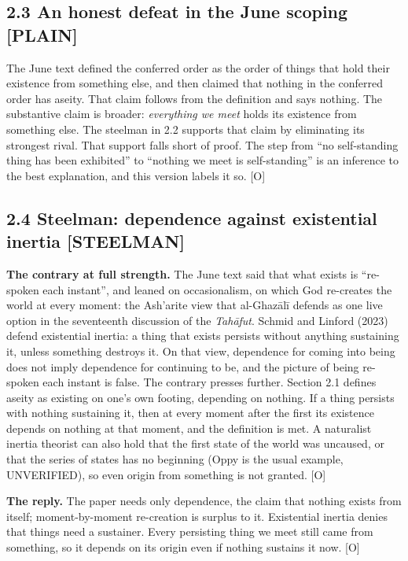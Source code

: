 \documentclass[11pt]{article}
\newcommand{\register}[1]{{\ttfamily\small #1}}
\begin{document}
\subsection*{2.3 An honest defeat in the June scoping \register{[PLAIN]}}

The June text defined the conferred order as the order of things that hold their existence from something else, and then claimed that nothing in the conferred order has aseity. That claim follows from the definition and says nothing. The substantive claim is broader: \emph{everything we meet} holds its existence from something else. The steelman in 2.2 supports that claim by eliminating its strongest rival. That support falls short of proof. The step from ``no self-standing thing has been exhibited'' to ``nothing we meet is self-standing'' is an inference to the best explanation, and this version labels it so. [O]

\subsection*{2.4 Steelman: dependence against existential inertia \register{[STEELMAN]}}

\textbf{The contrary at full strength.} The June text said that what exists is ``re-spoken each instant'', and leaned on occasionalism, on which God re-creates the world at every moment: the Ash'arite view that al-Ghazālī defends as one live option in the seventeenth discussion of the \emph{Tahāfut}. Schmid and Linford (2023) defend existential inertia: a thing that exists persists without anything sustaining it, unless something destroys it. On that view, dependence for coming into being does not imply dependence for continuing to be, and the picture of being re-spoken each instant is false. The contrary presses further. Section 2.1 defines aseity as existing on one's own footing, depending on nothing. If a thing persists with nothing sustaining it, then at every moment after the first its existence depends on nothing at that moment, and the definition is met. A naturalist inertia theorist can also hold that the first state of the world was uncaused, or that the series of states has no beginning (Oppy is the usual example, UNVERIFIED), so even origin from something is not granted. [O]

\textbf{The reply.} The paper needs only dependence, the claim that nothing exists from itself; moment-by-moment re-creation is surplus to it. Existential inertia denies that things need a sustainer. Every persisting thing we meet still came from something, so it depends on its origin even if nothing sustains it now. [O]
\end{document}
